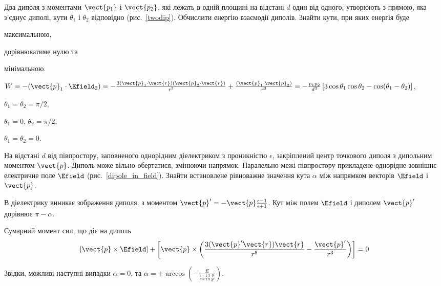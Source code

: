 \begin{problem}\label{prb:twodip}
Два диполя з моментами $\vect{p_1}$ і $\vect{p_2}$, які лежать в одній площині на відстані $d$ один від одного, утворюють з прямою, яка з'єднує диполі, кути $\theta_1$ і $\theta_2$ відповідно (рис.~\ref{twodip}). Обчислити енергію взаємодії диполів. Знайти кути, при яких енергія буде
\begin{enumerate*}[label=\alph*)]
	\item максимальною,
	\item дорівнюватиме нулю та
	\item мінімальною.
\end{enumerate*}
\begin{solution}
	$W = -(\vect{p}_1\cdot \Efield_2) = -\frac{3(\vect{p}_1\cdot\vect{r})(\vect{p}_2\cdot\vect{r})}{r^5}  + \frac{(\vect{p}_1\cdot\vect{p}_2)}{r^3}= -\frac{p_1p_2}{d^3}\left[ 3\cos\theta_1\cos\theta_2 - \cos(\theta_1 - \theta_2)\right] $,
	\begin{enumerate*}[label=\alph*)]
		\item $\theta_1 = \theta_2 = \pi/2$,
		\item $\theta_1 =0$, $\theta_2 =\pi/2$,
		\item $\theta_1 = \theta_2 = 0$.
	\end{enumerate*}
\end{solution}
\end{problem}

\begin{problem}\label{prb:dipole_in_field}
На відстані $d$ від півпростору, заповненого однорідним діелектриком з проникністю $\epsilon$, закріплений центр точкового диполя з дипольним моментом $\vect{p}$. Диполь може вільно обертатися, змінюючи напрямок. Паралельно межі півпростору прикладене однорідне зовнішнє електричне поле $\Efield$ (рис.~\ref{dipole_in_field}). Знайти встановлене рівноважне значення кута $\alpha$ між напрямком векторів $\Efield$ і $\vect{p}$.
\begin{solution}
	В діелектрику виникає зображення диполя, з моментом $\vect{p}' = -\vect{p}\frac{\epsilon - 1}{\epsilon + 1}$. Кут між полем $\Efield$ і диполем $\vect{p}'$ дорівнює $\pi - \alpha$.

	Сумарний момент сил, що діє на диполь
    \[
        \left[\vect{p}\times\Efield\right] + \left[\vect{p}\times\left( \frac{3(\vect{p}'\vect{r})\vect{r}}{r^5} - \frac{\vect{p}'}{r^3} \right) \right] = 0
    \]

	Звідки,  можливі наступні випадки $\alpha = 0$, та $\alpha = \pm\arccos\left( -\frac{E}{\frac{\epsilon - 1}{\epsilon + 1} \frac38\frac{p}{d^3}}\right) $.
\end{solution}
\end{problem}

